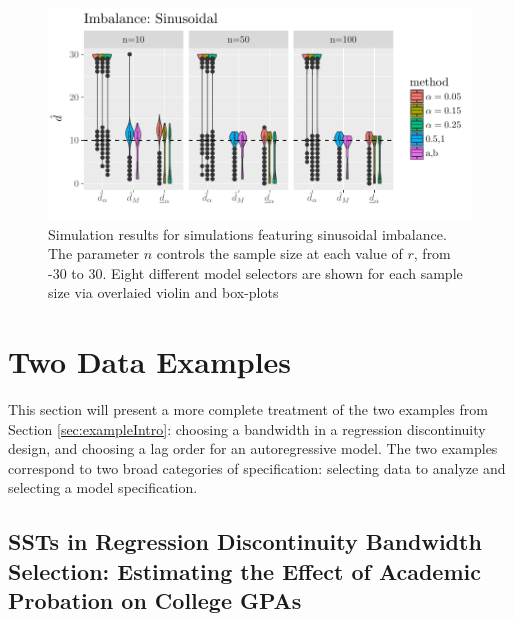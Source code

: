 \documentclass[12pt]{article}\usepackage[]{graphicx}\usepackage[]{color}
\makeatletter
\def\maxwidth{ %
  \ifdim\Gin@nat@width>\linewidth
    \linewidth
  \else
    \Gin@nat@width
  \fi
}
\makeatother
\begin{document}
\begin{figure}

\includegraphics[width=\maxwidth]{figure/sinusoidalImbalance-1} 

\caption{Simulation results for simulations featuring sinusoidal
  imbalance. The parameter $n$ controls the sample size at each value
  of $r$, from -30 to 30. Eight different model selectors are shown
  for each sample size via overlaied violin and box-plots}
\label{fig:linImb}
\end{figure}




\section{Two Data Examples}\label{sec:examples}

This section will present a more complete treatment of the two
examples from Section \ref{sec:exampleIntro}: choosing a bandwidth in
a regression discontinuity design, and choosing a lag order for an
autoregressive model.
The two examples correspond to two broad categories of
specification: selecting data to analyze and
selecting a model specification.

\subsection{SSTs in Regression Discontinuity Bandwidth Selection:
  Estimating the Effect of  Academic Probation on College GPAs}
\end{document}
